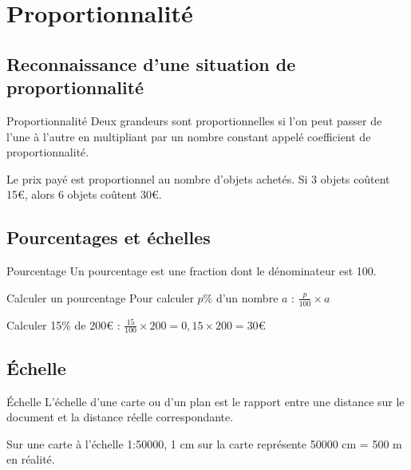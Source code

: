 \chapter{Proportionnalité}

\section{Reconnaissance d'une situation de proportionnalité}
\begin{definition}{Proportionnalité}
Deux grandeurs sont proportionnelles si l'on peut passer de l'une à l'autre en multipliant par un nombre constant appelé coefficient de proportionnalité.
\end{definition}

\begin{exemple}
Le prix payé est proportionnel au nombre d'objets achetés. Si 3 objets coûtent 15€, alors 6 objets coûtent 30€.
\end{exemple}

\section{Pourcentages et échelles}
\begin{definition}{Pourcentage}
Un pourcentage est une fraction dont le dénominateur est 100.
\end{definition}

\begin{methode}{Calculer un pourcentage}
Pour calculer $p\%$ d'un nombre $a$ :
$\frac{p}{100} \times a$
\end{methode}

\begin{exemple}
Calculer 15\% de 200€ :
$\frac{15}{100} \times 200 = 0,15 \times 200 = 30$€
\end{exemple}

\section{Échelle}
\begin{definition}{Échelle}
L'échelle d'une carte ou d'un plan est le rapport entre une distance sur le document et la distance réelle correspondante.
\end{definition}

\begin{exemple}
Sur une carte à l'échelle 1:50000, 1 cm sur la carte représente 50000 cm = 500 m en réalité.
\end{exemple} 